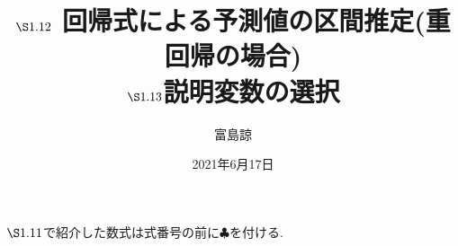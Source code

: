 \documentclass[a4paper,10pt,dvipdfmx]{jsarticle}
\begin{document}
\title{\vspace{-2cm}$\S1.12$ 回帰式による予測値の区間推定(重回帰の場合)\\ $\S1.13$説明変数の選択}
\author{富島諒}
\date{2021年6月17日}

\maketitle

$\S1.11$で紹介した数式は式番号の前に$\clubsuit$を付ける. 




\end{document}
